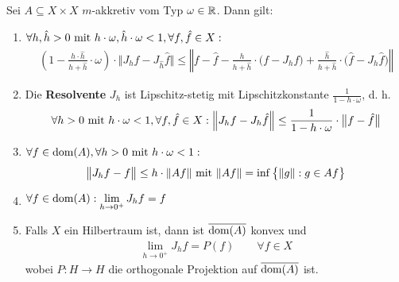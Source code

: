 \begin{theorem}\label{Theorem1.2.9}
Sei $A\subseteq X\times X$ $m$-akkretiv vom Typ $\omega\in\R$. Dann gilt:
\begin{enumerate}[label=(\alph*)]
\item $\begin{aligned}
\forall h,\hat{h}>0\mit h\cdot\omega,\hat{h}\cdot\omega<1,\forall f,\hat{f}\in X:\end{aligned}$
\begin{align*}
\left(1-\frac{h\cdot\hat{h}}{h+\hat{h}}\cdot\omega\right)\cdot\Big\Vert J_h f-J_{\hat{h}}\hat{f}\Big\Vert
\leq
\left\Vert f-\hat{f}-\frac{h}{h+\hat{h}}\cdot\big(f-J_h f\big)+\frac{\hat{h}}{h+\hat{h}}\cdot\big(\hat{f}-J_h \hat{f}\big)\right\Vert
\end{align*}
\item Die \textbf{Resolvente} $J_h$ ist Lipschitz-stetig mit Lipschitzkonstante $\frac{1}{1-h\cdot\omega}$, d. h.
\begin{align*}
\forall h>0\mit h\cdot \omega<1,\forall f,\hat{f}\in X:
\Big\Vert J_h f- J_h\hat{f}\Big\Vert
\leq
\frac{1}{1-h\cdot\omega}\cdot\big\Vert f-\hat{f}\big\Vert
\end{align*}
\item $\begin{aligned}
\forall f\in\dom(A),\forall h>0\mit h\cdot\omega<1:
\end{aligned}$
\begin{align*}
\big\Vert J_h f-f\big\Vert
\leq
h\cdot\Vert A f\Vert\mit\Vert A f\Vert=\inf\big\lbrace\Vert g\Vert:g\in A f\big\rbrace
\end{align*}
\item $\begin{aligned}
\forall f\in\dom(A):\lim\limits_{h\to0^+} J_h f=f
\end{aligned}$
\item Falls $X$ ein Hilbertraum ist, dann ist $\overline{\dom(A)}$ konvex und
\begin{align*}
\lim\limits_{h\to0^+} J_h f=P(f)\qquad\forall f\in X
\end{align*}
wobei $P:H\to H$ die orthogonale Projektion auf $\overline{\dom(A)}$ ist.
\end{enumerate}
\end{theorem}

